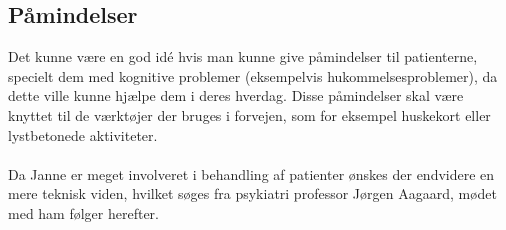 \subsection{Påmindelser}
Det kunne være en god idé hvis man kunne give påmindelser til patienterne, specielt dem med kognitive problemer (eksempelvis hukommelsesproblemer), da dette ville kunne hjælpe dem i deres hverdag.
Disse påmindelser skal være knyttet til de værktøjer der bruges i forvejen, som for eksempel huskekort eller lystbetonede aktiviteter.

\paragraph{}
Da Janne er meget involveret i behandling af patienter ønskes der endvidere en mere teknisk viden, hvilket søges fra psykiatri professor Jørgen Aagaard, mødet med ham følger herefter.